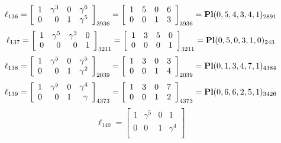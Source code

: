 \documentclass{article}
\begin{document}
{$$
\ell_{136} = 
\left[
\begin{array}{*{4}{r}}
1 & \gamma^{3} & 0 & \gamma^{6}\\
0 & 0 & 1 & \gamma^{5}\\
\end{array}
\right]
_{3936}
=
\left[
\begin{array}{*{4}c}
1  & 5  & 0  & 6\\
0  & 0  & 1  & 3\\
\end{array}
\right]_{3936}
={\rm\bf Pl}(0,5,4,3,4,1 )_{2891}$$
$$
\ell_{137} = 
\left[
\begin{array}{*{4}{r}}
1 & \gamma^{5} & \gamma^{3} & 0\\
0 & 0 & 0 & 1\\
\end{array}
\right]
_{3211}
=
\left[
\begin{array}{*{4}c}
1  & 3  & 5  & 0\\
0  & 0  & 0  & 1\\
\end{array}
\right]_{3211}
={\rm\bf Pl}(0,5,0,3,1,0 )_{243}$$
$$
\ell_{138} = 
\left[
\begin{array}{*{4}{r}}
1 & \gamma^{5} & 0 & \gamma^{5}\\
0 & 0 & 1 & \gamma^{2}\\
\end{array}
\right]
_{2039}
=
\left[
\begin{array}{*{4}c}
1  & 3  & 0  & 3\\
0  & 0  & 1  & 4\\
\end{array}
\right]_{2039}
={\rm\bf Pl}(0,1,3,4,7,1 )_{4384}$$
$$
\ell_{139} = 
\left[
\begin{array}{*{4}{r}}
1 & \gamma^{5} & 0 & \gamma^{4}\\
0 & 0 & 1 & \gamma \\
\end{array}
\right]
_{4373}
=
\left[
\begin{array}{*{4}c}
1  & 3  & 0  & 7\\
0  & 0  & 1  & 2\\
\end{array}
\right]_{4373}
={\rm\bf Pl}(0,6,6,2,5,1 )_{3426}$$
$$
\ell_{140} = 
\left[
\begin{array}{*{4}{r}}
1 & \gamma^{5} & 0 & 1\\
0 & 0 & 1 & \gamma^{4}\\
\end{array}
\right]
$$}
\end{document}
